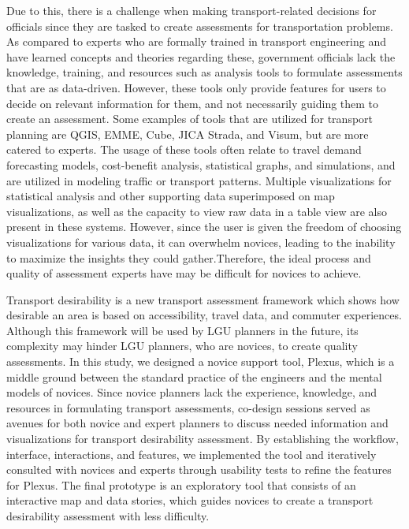 \documentclass{sigchi}
\begin{document}
Due to this, there is a challenge when making transport-related decisions for officials since they are tasked to create assessments for transportation problems. As compared to experts who are formally trained in transport engineering and have learned concepts and theories regarding these, government officials lack the knowledge, training, and resources such as analysis tools to formulate assessments that are as data-driven. However, these tools only provide features for users to decide on relevant information for them, and not necessarily guiding them to create an assessment. Some examples of tools that are utilized for transport planning are QGIS, EMME, Cube, JICA Strada, and Visum, but are more catered to experts. The usage of these tools often relate to travel demand forecasting models, cost-benefit analysis, statistical graphs, and simulations, and are utilized in modeling traffic or transport patterns. Multiple visualizations for statistical analysis and other supporting data superimposed on map visualizations, as well as the capacity to view raw data in a table view are also present in these systems. However, since the user is given the freedom of choosing visualizations for various data, it can overwhelm novices, leading to the inability to maximize the insights they could gather.Therefore, the ideal process and quality of assessment experts have may be difficult for novices to achieve.

Transport desirability is a new transport assessment framework which shows how desirable an area is based on accessibility, travel data, and commuter experiences. Although this framework will be used by LGU planners in the future, its complexity may hinder LGU planners, who are novices, to create quality assessments. In this study, we designed a novice support tool, Plexus, which is a middle ground between the standard practice of the engineers and the mental models of novices. Since novice planners lack the experience, knowledge, and resources in formulating transport assessments, co-design sessions served as avenues for both novice and expert planners to discuss needed information and visualizations for transport desirability assessment.  By establishing the workflow, interface, interactions, and features, we implemented the tool and iteratively consulted with novices and experts through usability tests to refine the features for Plexus. The final prototype is an exploratory tool that consists of an interactive map and data stories, which guides novices to create a transport desirability assessment with less difficulty.
\end{document}
